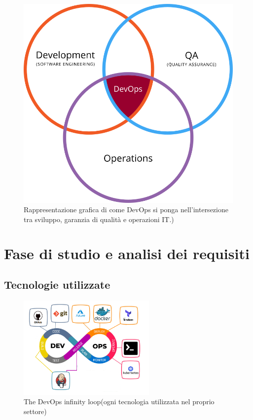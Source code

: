 \documentclass[a4paper,12pt]{report}
\begin{document}
\begin{figure}[h]
	\includegraphics[width=1.0\textwidth]{def_devops}
    \caption{Rappresentazione grafica di come DevOps si ponga nell'intersezione tra sviluppo, garanzia di qualità e operazioni IT.) \cite{defdevops}}
    \label{fig:def_devops}
\end{figure}


\chapter{Fase di studio e analisi dei requisiti}
\section{Tecnologie utilizzate}
\begin{figure}[h]
	\includegraphics[width=0.6\textwidth]{tech_used}
    \caption{The DevOps infinity loop(ogni tecnologia utilizzata nel proprio settore) \cite{devopsloopimg}}
    \label{fig:tech_used}
\end{figure}
\end{document}

